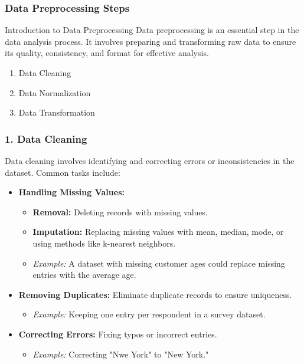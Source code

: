 \documentclass[aspectratio=169]{beamer}
\begin{document}
\begin{frame}[fragile]
    \frametitle{Data Preprocessing Steps}
    \begin{block}{Introduction to Data Preprocessing}
        Data preprocessing is an essential step in the data analysis process. It involves preparing and transforming raw data to ensure its quality, consistency, and format for effective analysis.
    \end{block}
    \begin{enumerate}
        \item Data Cleaning
        \item Data Normalization
        \item Data Transformation
    \end{enumerate}
\end{frame}

\begin{frame}[fragile]
    \frametitle{1. Data Cleaning}
    Data cleaning involves identifying and correcting errors or inconsistencies in the dataset. Common tasks include:
    \begin{itemize}
        \item \textbf{Handling Missing Values:}
            \begin{itemize}
                \item \textbf{Removal:} Deleting records with missing values.
                \item \textbf{Imputation:} Replacing missing values with mean, median, mode, or using methods like k-nearest neighbors.
                \item \textit{Example:} A dataset with missing customer ages could replace missing entries with the average age.
            \end{itemize}
        \item \textbf{Removing Duplicates:} Eliminate duplicate records to ensure uniqueness.
            \begin{itemize}
                \item \textit{Example:} Keeping one entry per respondent in a survey dataset.
            \end{itemize}
        \item \textbf{Correcting Errors:} Fixing typos or incorrect entries.
            \begin{itemize}
                \item \textit{Example:} Correcting "Nwe York" to "New York."
            \end{itemize}
    \end{itemize}
\end{frame}
\end{document}
